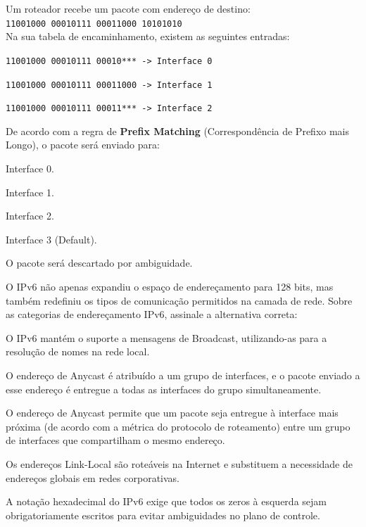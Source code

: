 \documentclass[11pt, addpoints]{modelo/prova2}
\begin{document}
\question[0.5] Um roteador recebe um pacote com endereço de destino:\\ \verb|11001000 00010111 00011000 10101010|\\[0.5em] Na sua tabela de encaminhamento, existem as seguintes entradas:
    \begin{statements}
        \item \verb|11001000 00010111 00010*** -> Interface 0|
        \item \verb|11001000 00010111 00011000 -> Interface 1|
        \item \verb|11001000 00010111 00011*** -> Interface 2|
    \end{statements}
    De acordo com a regra de \textbf{Prefix Matching} (Correspondência de Prefixo mais Longo), o pacote será enviado para:

    \begin{choices}
        \item Interface 0.
        \item Interface 1.
        \item Interface 2.
        \item Interface 3 (Default).
        \item O pacote será descartado por ambiguidade.
    \end{choices} 
\question[0.5] O IPv6 não apenas expandiu o espaço de endereçamento para 128 bits, mas também redefiniu os tipos de comunicação permitidos na camada de rede. Sobre as categorias de endereçamento IPv6, assinale a alternativa correta:
    \begin{choices}
        \item O IPv6 mantém o suporte a mensagens de Broadcast, utilizando-as para a resolução de nomes na rede local.
        \item O endereço de Anycast é atribuído a um grupo de interfaces, e o pacote enviado a esse endereço é entregue a todas as interfaces do grupo simultaneamente.
        \item O endereço de Anycast permite que um pacote seja entregue à interface mais próxima (de acordo com a métrica do protocolo de roteamento) entre um grupo de interfaces que compartilham o mesmo endereço.
        \item Os endereços Link-Local são roteáveis na Internet e substituem a necessidade de endereços globais em redes corporativas.
        \item A notação hexadecimal do IPv6 exige que todos os zeros à esquerda sejam obrigatoriamente escritos para evitar ambiguidades no plano de controle.
    \end{choices} 
\end{document}
